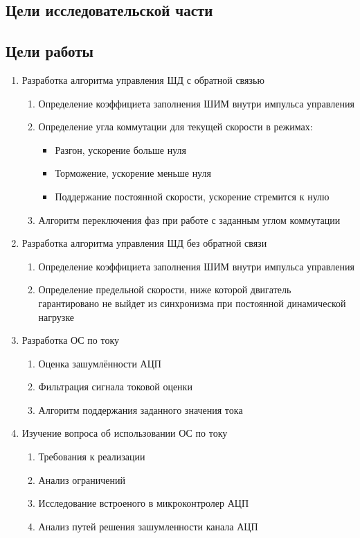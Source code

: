 \ifdefined\DIPLOMA
    \subsection{Цели исследовательской части}
\else
    \subsection{Цели работы}
\fi

\begin{enumerate}
    \item{Разработка алгоритма управления ШД с обратной связью}
    \begin{enumerate}
        \item Определение коэффициета заполнения ШИМ внутри импульса управления
        \item Определение угла коммутации для текущей скорости в режимах:
            \begin{itemize}
                \item Разгон, ускорение больше нуля
                \item Торможение, ускорение меньше нуля
                \item Поддержание постоянной скорости, ускорение стремится к нулю
            \end{itemize}
        \item Алгоритм переключения фаз при работе с заданным углом коммутации
    \end{enumerate}

    \item{Разработка алгоритма управления ШД без обратной связи}
        \begin{enumerate}
            \item Определение коэффициета заполнения ШИМ внутри импульса управления
            \item Определение предельной скорости, ниже которой двигатель гарантировано не выйдет из
                синхронизма при постоянной динамической нагрузке
        \end{enumerate}

\ifdefined\DIPLOMA
    \item{Разработка ОС по току}
        \begin{enumerate}
            \item Оценка зашумлённости АЦП
            \item Фильтрация сигнала токовой оценки
            \item Алгоритм поддержания заданного значения тока
        \end{enumerate}
\else
    \item{Изучение вопроса об использовании ОС по току}
        \begin{enumerate}
            \item Требования к реализации
            \item Анализ ограничений
            \item Исследование встроеного в микроконтролер АЦП
            \item Анализ путей решения зашумленности канала АЦП
        \end{enumerate}
\fi


\end{enumerate}
